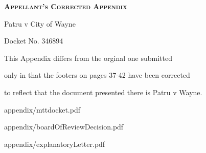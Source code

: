 \documentclass[12pt,\documentclassflag]{article}
\begin{document}

\begin{centering}
  \bf\scshape Appellant's Corrected Appendix\par%
  \rm Patru v City of Wayne\par%
  Docket No. 346894\par%
  \vspace{1em}%
  This Appendix differs from the orginal one submitted \par%
  only in that the footers on pages 37-42 have been corrected \par%
  to reflect that the document presented there is Patru v Wayne.\par%
\end{centering}

\tableofcontents
\newpage
\renewcommand{\footrulewidth}{0.4pt}

\newcommand{\addLabelsToAllIncludedPages}[1]{%
   \refstepcounter{includepdfpage}%
   \stepcounter{currentpagecounter}%
   \label{#1.\thecurrentpagecounter}}%

\newcommand{\myincludepdf}[2]{%
  \setcounter{currentpagecounter}{0}%
  {appendix/#1.pdf}}%
  
\renewcommand{\sectionmark}[1]{\markboth{#1}{}}%
\myincludepdf{mttdocket}{1,section, 1, Tax Tribunal Docket}

\renewcommand{\sectionmark}[1]{\markboth{Board of Review Decision}{}}%
\myincludepdf{boardOfReviewDecision}{1,section,1,Board of Review Decision (docket line 2)}%


\myincludepdf{explanatoryLetter}{1,section,1,Appellant's Evidence,evidence,1,subsection,2,Explanatory Letter (docket line 38)}%
\end{document}
